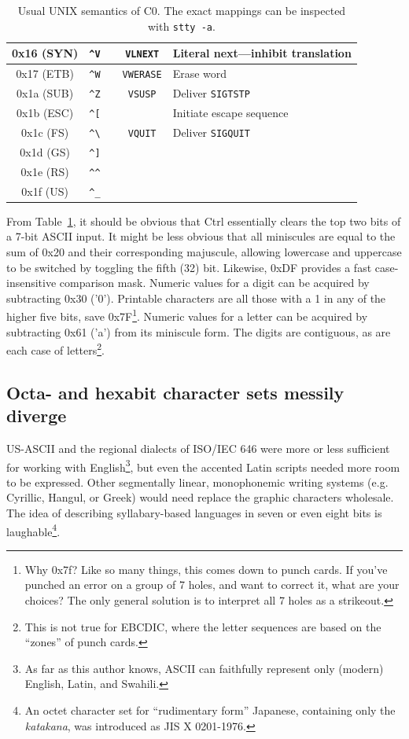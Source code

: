 \begin{table}[!htb]
\begin{tabular}{ |c|c|c|c|l| }
    \hline
    0x16 (SYN) & \texttt{\^{}V} & & \texttt{VLNEXT} & Literal next---inhibit translation\\
    \hline
    0x17 (ETB) & \texttt{\^{}W} & & \texttt{VWERASE} & Erase word \\
    \hline
    0x1a (SUB) & \texttt{\^{}Z} & & \texttt{VSUSP} & Deliver \texttt{SIGTSTP} \\
    \hline
    0x1b (ESC) & \texttt{\^{}[} & & & Initiate escape sequence \\
    \hline
    0x1c (FS) & \texttt{\^{}\textbackslash{}} & & \texttt{VQUIT} & Deliver \texttt{SIGQUIT} \\
    \hline
    0x1d (GS) & \texttt{\^{}]} & & & \\
    \hline
    0x1e (RS) & \texttt{\^{}\^{}} & & & \\
    \hline
    0x1f (US) & \texttt{\^{}\_} & & & \\
    \hline
  \end{tabular}
  \caption[Usual UNIX semantics of C0]{Usual UNIX semantics of C0. The exact mappings can be inspected with \texttt{stty -a}.}
  \label{table:c0maps}
\end{table}

From Table~\ref{table:c0maps}, it should be obvious that Ctrl essentially clears
the top two bits of a 7-bit ASCII input. It might be less obvious that all
miniscules are equal to the sum of 0x20 and their corresponding majuscule,
allowing lowercase and uppercase to be switched by toggling the fifth (32) bit.
Likewise, 0xDF provides a fast case-insensitive comparison mask. Numeric values
for a digit can be acquired by subtracting 0x30 ('0'). Printable characters are all
those with a 1 in any of the higher five bits, save 0x7F\footnote{Why 0x7f? Like
so many things, this comes down to punch cards. If you've punched an error on
a group of 7 holes, and want to correct it, what are your choices? The only
general solution is to interpret all 7 holes as a strikeout\cite{cardpunch}.}. Numeric values for a
letter can be acquired by subtracting 0x61 ('a') from its miniscule form. The
digits are contiguous, as are each case of letters\footnote{This is not true for
EBCDIC, where the letter sequences are based on the ``zones'' of punch cards\cite{nickgammon}.}.

\subsection{Octa- and hexabit character sets messily diverge}
US-ASCII and the regional dialects of ISO/IEC 646 were more or less sufficient
for working with English\footnote{As far as this author knows, ASCII
can faithfully represent only (modern) English, Latin, and Swahili.}, but even
the accented Latin scripts needed more room to be expressed. Other
segmentally linear, monophonemic writing systems (e.g. Cyrillic, Hangul, or
Greek) would need replace the graphic characters wholesale. The idea of
describing syllabary-based languages in seven or even eight bits is
laughable\footnote{An octet character set for ``rudimentary form'' Japanese,
containing only the \textit{katakana}, was introduced as JIS X 0201-1976.}.

